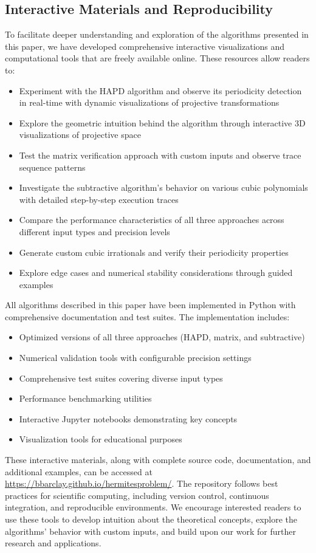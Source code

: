 \subsection{Interactive Materials and Reproducibility}

To facilitate deeper understanding and exploration of the algorithms presented in this paper, we have developed comprehensive interactive visualizations and computational tools that are freely available online. These resources allow readers to:

\begin{itemize}
\item Experiment with the HAPD algorithm and observe its periodicity detection in real-time with dynamic visualizations of projective transformations
\item Explore the geometric intuition behind the algorithm through interactive 3D visualizations of projective space
\item Test the matrix verification approach with custom inputs and observe trace sequence patterns
\item Investigate the subtractive algorithm's behavior on various cubic polynomials with detailed step-by-step execution traces
\item Compare the performance characteristics of all three approaches across different input types and precision levels
\item Generate custom cubic irrationals and verify their periodicity properties
\item Explore edge cases and numerical stability considerations through guided examples
\end{itemize}

All algorithms described in this paper have been implemented in Python with comprehensive documentation and test suites. The implementation includes:

\begin{itemize}
\item Optimized versions of all three approaches (HAPD, matrix, and subtractive)
\item Numerical validation tools with configurable precision settings
\item Comprehensive test suites covering diverse input types
\item Performance benchmarking utilities
\item Interactive Jupyter notebooks demonstrating key concepts
\item Visualization tools for educational purposes
\end{itemize}

These interactive materials, along with complete source code, documentation, and additional examples, can be accessed at \url{https://bbarclay.github.io/hermitesproblem/}. The repository follows best practices for scientific computing, including version control, continuous integration, and reproducible environments. We encourage interested readers to use these tools to develop intuition about the theoretical concepts, explore the algorithms' behavior with custom inputs, and build upon our work for further research and applications.

